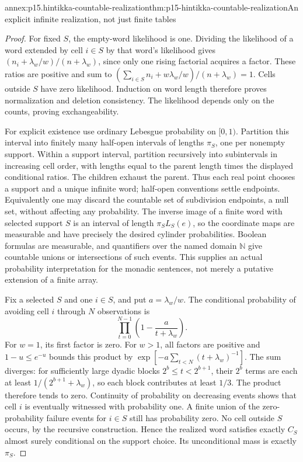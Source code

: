 \begin{annexitem}{annex:p15.hintikka-countable-realization}{thm:p15-hintikka-countable-realization}{An explicit infinite realization, not just finite tables}
\begin{proof}
For fixed \(S\), the empty-word likelihood is one. Dividing the
likelihood of a word extended by cell \(i\in S\) by that word's
likelihood gives \((n_i+\lambda_w/w)/(n+\lambda_w)\), since only
one rising factorial acquires a factor. These ratios are positive and
sum to
\((\sum_{i\in S}n_i+w\lambda_w/w)/(n+\lambda_w)=1\).
Cells outside \(S\) have zero likelihood. Induction on word length
therefore proves normalization and deletion consistency. The likelihood
depends only on the counts, proving exchangeability.

For explicit existence use ordinary Lebesgue probability on \([0,1)\).
Partition this interval into finitely many half-open intervals of lengths
\(\pi_S\), one per nonempty support. Within a support interval,
partition recursively into subintervals in increasing cell order, with
lengths equal to the parent length times the displayed conditional
ratios. The children exhaust the parent. Thus each real point chooses
a support and a unique infinite word; half-open conventions settle
endpoints. Equivalently one may discard the countable set of subdivision
endpoints, a null set, without affecting any probability. The inverse
image of a finite word with selected support \(S\) is an interval
of length \(\pi_SL_S(e)\), so the coordinate maps are measurable
and have precisely the desired cylinder probabilities. Boolean formulas
are measurable, and quantifiers over the named domain \(\mathbb N\)
give countable unions or intersections of such events. This supplies an
actual probability interpretation for the monadic sentences, not merely
a putative extension of a finite array.

Fix a selected \(S\) and one \(i\in S\), and put
\(a=\lambda_w/w\). The conditional probability of avoiding cell
\(i\) through \(N\) observations is
\[
 \prod_{t=0}^{N-1}\left(1-\frac a{t+\lambda_w}\right).
\]
For \(w=1\), its first factor is zero. For \(w>1\), all factors
are positive and \(1-u\leq e^{-u}\) bounds this product by
\(\exp[-a\sum_{t<N}(t+\lambda_w)^{-1}]\).
The sum diverges: for sufficiently large dyadic blocks
\(2^b\leq t<2^{b+1}\), their \(2^b\) terms are each at least
\(1/(2^{b+1}+\lambda_w)\), so each block contributes at least
\(1/3\). The product therefore tends to zero. Continuity of
probability on decreasing events shows that cell \(i\) is eventually
witnessed with probability one. A finite union of the zero-probability
failure events for \(i\in S\) still has probability zero. No cell
outside \(S\) occurs, by the recursive construction. Hence the
realized word satisfies exactly \(C_S\) almost surely conditional on
the support choice. Its unconditional mass is exactly \(\pi_S\).


\end{proof}
\end{annexitem}
